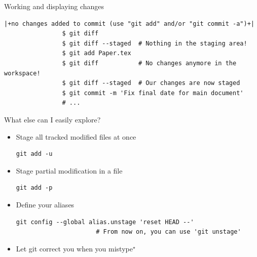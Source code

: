 \documentclass[usenames,svgnames,14pt]{beamer}
\begin{document}
\begin{frame}[fragile]{Working and displaying changes}
\begin{overlayarea}{\textwidth}{0.7\textheight}
\begin{onlyenv}
\begin{lstlisting}[style=MyBash, aboveskip=2mm, xleftmargin=-6mm, xrightmargin=-6mm]
                |+no changes added to commit (use "git add" and/or "git commit -a")+|
                $ git diff
                $ git diff --staged  # Nothing in the staging area!
                $ git add Paper.tex
                $ git diff           # No changes anymore in the workspace!
                $ git diff --staged  # Our changes are now staged
                $ git commit -m 'Fix final date for main document'
                # ...
            \end{lstlisting}
        \end{onlyenv}
    \end{overlayarea}
\end{frame}
\begin{frame}[fragile]{What else can I easily explore?}
    \begin{itemize}
        \item Stage all tracked modified files at once\\[1mm]
              \begin{minipage}{\linewidth}
                  \begin{lstlisting}[style=MyBash]
                      git add -u
                  \end{lstlisting}
              \end{minipage}
        \item Stage partial modification in a file\\[1mm]
              \begin{minipage}{\linewidth}
                  \begin{lstlisting}[style=MyBash]
                      git add -p
                  \end{lstlisting}
              \end{minipage}
        \item Define your aliases\\[1mm]
              \begin{minipage}{\linewidth}
                  \begin{lstlisting}[style=MyBash]
                      git config --global alias.unstage 'reset HEAD --'
                      # From now on, you can use 'git unstage'
                  \end{lstlisting}
              \end{minipage}
        \item Let git correct you when you mistype$^\star$\\[1mm]
              \begin{minipage}{\linewidth}

\end{minipage}
\end{itemize}
\end{frame}
\end{document}
